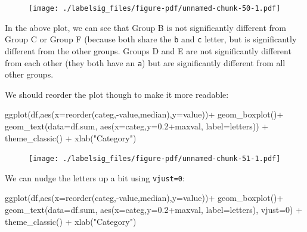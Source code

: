 \documentclass[
  letterpaper,
  DIV=11,
  numbers=noendperiod]{scrreprt}
\newenvironment{Shaded}{\begin{snugshade}}{\end{snugshade}}
\newcommand{\AttributeTok}[1]{\textcolor[rgb]{0.40,0.45,0.13}{#1}}
\newcommand{\DecValTok}[1]{\textcolor[rgb]{0.68,0.00,0.00}{#1}}
\newcommand{\FloatTok}[1]{\textcolor[rgb]{0.68,0.00,0.00}{#1}}
\newcommand{\FunctionTok}[1]{\textcolor[rgb]{0.28,0.35,0.67}{#1}}
\newcommand{\NormalTok}[1]{\textcolor[rgb]{0.00,0.23,0.31}{#1}}
\newcommand{\SpecialCharTok}[1]{\textcolor[rgb]{0.37,0.37,0.37}{#1}}
\newcommand{\StringTok}[1]{\textcolor[rgb]{0.13,0.47,0.30}{#1}}
\begin{document}
\begin{figure}[H]

{\centering \texttt{[image: ./labelsig\_files/figure-pdf/unnamed-chunk-50-1.pdf]}

}

\end{figure}

In the above plot, we can see that Group B is not significantly
different from Group C or Group F (because both share the \texttt{b} and
\texttt{c} letter, but is significantly different from the other groups.
Groups D and E are not significantly different from each other (they
both have an \texttt{a}) but are significantly different from all other
groups.

We should reorder the plot though to make it more readable:

\begin{Shaded}
\begin{Highlighting}[]
\FunctionTok{ggplot}\NormalTok{(df,}\FunctionTok{aes}\NormalTok{(}\AttributeTok{x=}\FunctionTok{reorder}\NormalTok{(categ,}\SpecialCharTok{{-}}\NormalTok{value,median),}\AttributeTok{y=}\NormalTok{value))}\SpecialCharTok{+}
  \FunctionTok{geom\_boxplot}\NormalTok{()}\SpecialCharTok{+}
  \FunctionTok{geom\_text}\NormalTok{(}\AttributeTok{data=}\NormalTok{df.sum,}
            \FunctionTok{aes}\NormalTok{(}\AttributeTok{x=}\NormalTok{categ,}\AttributeTok{y=}\FloatTok{0.2}\SpecialCharTok{+}\NormalTok{maxval,}
                \AttributeTok{label=}\NormalTok{letters)) }\SpecialCharTok{+}
  \FunctionTok{theme\_classic}\NormalTok{() }\SpecialCharTok{+}
  \FunctionTok{xlab}\NormalTok{(}\StringTok{"Category"}\NormalTok{)}
\end{Highlighting}
\end{Shaded}

\begin{figure}[H]

{\centering \texttt{[image: ./labelsig\_files/figure-pdf/unnamed-chunk-51-1.pdf]}

}

\end{figure}

We can nudge the letters up a bit using \texttt{vjust=0}:

\begin{Shaded}
\begin{Highlighting}[]
\FunctionTok{ggplot}\NormalTok{(df,}\FunctionTok{aes}\NormalTok{(}\AttributeTok{x=}\FunctionTok{reorder}\NormalTok{(categ,}\SpecialCharTok{{-}}\NormalTok{value,median),}\AttributeTok{y=}\NormalTok{value))}\SpecialCharTok{+}
  \FunctionTok{geom\_boxplot}\NormalTok{()}\SpecialCharTok{+}
  \FunctionTok{geom\_text}\NormalTok{(}\AttributeTok{data=}\NormalTok{df.sum,}
            \FunctionTok{aes}\NormalTok{(}\AttributeTok{x=}\NormalTok{categ,}\AttributeTok{y=}\FloatTok{0.2}\SpecialCharTok{+}\NormalTok{maxval,}
                \AttributeTok{label=}\NormalTok{letters), }\AttributeTok{vjust=}\DecValTok{0}\NormalTok{) }\SpecialCharTok{+}
  \FunctionTok{theme\_classic}\NormalTok{() }\SpecialCharTok{+}
  \FunctionTok{xlab}\NormalTok{(}\StringTok{"Category"}\NormalTok{)}
\end{Highlighting}
\end{Shaded}
\end{document}
